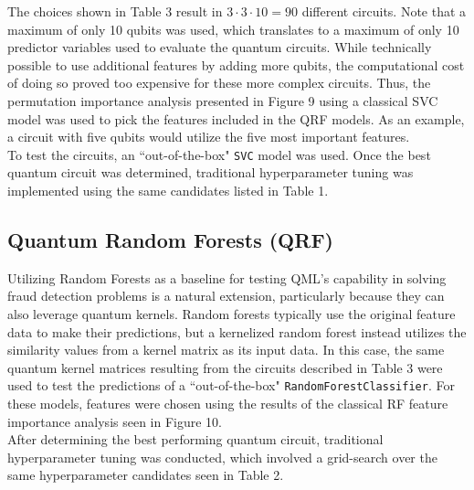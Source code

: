 \documentclass[11pt, oneside]{article}   	%
\begin{document}
The choices shown in Table 3 result in $3 \cdot 3 \cdot 10 = 90$ different circuits. Note that a maximum of only 10 qubits was used, which translates to a maximum of only 10 predictor variables used to evaluate the quantum circuits. While technically possible to use additional features by adding more qubits, the computational cost of doing so proved too expensive for these more complex circuits. Thus, the permutation importance analysis presented in Figure 9 using a classical SVC model was used to pick the features included in the QRF models. As an example, a circuit with five qubits would utilize the five most important features.  \\

To test the circuits, an ``out-of-the-box" \texttt{SVC} model was used. Once the best quantum circuit was determined, traditional hyperparameter tuning was implemented using the same candidates listed in Table 1.




\subsection{Quantum Random Forests (QRF)}

Utilizing Random Forests as a baseline for testing QML's capability in solving fraud detection problems is a natural extension, particularly because they can also leverage quantum kernels. Random forests typically use the original feature data to make their predictions, but a kernelized random forest instead utilizes the similarity values from a kernel matrix as its input data. In this case, the same quantum kernel matrices resulting from the circuits described in Table 3 were used to test the predictions of a ``out-of-the-box" \texttt{RandomForestClassifier}. For these models, features were chosen using the results of the classical RF feature importance analysis seen in Figure 10.\\

After determining the best performing quantum circuit, traditional hyperparameter tuning was conducted, which involved a grid-search over the same hyperparameter candidates seen in Table 2.


\end{document}
